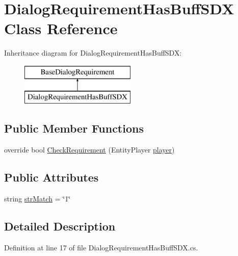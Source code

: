 \hypertarget{class_dialog_requirement_has_buff_s_d_x}{}\section{Dialog\+Requirement\+Has\+Buff\+S\+DX Class Reference}
\label{class_dialog_requirement_has_buff_s_d_x}
Inheritance diagram for Dialog\+Requirement\+Has\+Buff\+S\+DX\+:\begin{figure}[H]
\begin{center}
\leavevmode
\includegraphics[height=2.000000cm]{d8/d87/class_dialog_requirement_has_buff_s_d_x}
\end{center}
\end{figure}
\subsection*{Public Member Functions}
\begin{DoxyCompactItemize}
\item 
override bool \mbox{\hyperlink{class_dialog_requirement_has_buff_s_d_x_ac1b8f053e4c78283f56aa342360d48bc}{Check\+Requirement}} (Entity\+Player \mbox{\hyperlink{_sphere_i_i_01_music_01_boxes_2_config_2_localization_8txt_a4e2cb8aeff651600ea1cc57fe5a929a4}{player}})
\end{DoxyCompactItemize}
\subsection*{Public Attributes}
\begin{DoxyCompactItemize}
\item 
string \mbox{\hyperlink{class_dialog_requirement_has_buff_s_d_x_a38b5f555e5846a5d789ea75d71c1249e}{str\+Match}} = \char`\"{}1\char`\"{}
\end{DoxyCompactItemize}


\subsection{Detailed Description}


Definition at line 17 of file Dialog\+Requirement\+Has\+Buff\+S\+D\+X.\+cs.



